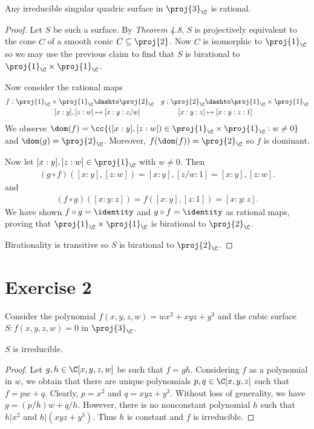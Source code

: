 \documentclass{article}
\begin{document}
\begin{claim*}[2]
  Any irreducible singular quadric surface in $\proj{3}_{\C}$ is rational.
  \begin{proof}
    Let $S$ be such a surface. By \emph{Theorem 4.8}, $S$ is projectively equivalent
    to the cone $\widehat C$ of a smooth conic $C\subseteq\proj{2}$. Now $C$ is isomorphic
    to $\proj{1}_{\C}$ so we may use the previous claim to find that $S$ is birational
    to $\proj{1}_{\C}\times\proj{1}_{\C}$.

    Now consider the rational maps
    \begin{align*}
      f : \proj{1}_{\C}\times\proj{1}_{\C} &\dashto \proj{2}_{\C} &
      g : \proj{2}_{\C} &\dashto \proj{1}_{\C}\times\proj{1}_{\C} \\
      [x:y],[z:w] &\mapsto [x:y:z/w] &
      [x:y:z] &\mapsto [x:y:z:1]
    \end{align*}
    We observe $\dom(f)=\cc{([x:y],[z:w])\in\proj{1}_{\C}\times\proj{1}_{\C} : w \neq 0}$
    and $\dom(g) = \proj{2}_{\C}$. Moreover, $f(\dom(f))=\proj{2}_{\C}$ so $f$ is dominant.

    Now let $[x:y],[z:w]\in\proj{1}_{\C}$ with $w\neq 0$. Then
    \begin{align*}
      (g\circ f)([x:y],[z:w]) = [x:y],[z/w : 1] = [x:y],[z:w].
    \end{align*}
    and
    \begin{align*}
      (f\circ g)([x:y:z]) = f([x:y],[z:1]) = [x:y:z].
    \end{align*}
    We have shown $f\circ g = \identity$ and $g\circ f=\identity$ as rational maps,
    proving that $\proj{1}_{\C}\times\proj{1}_{\C}$ is birational to $\proj{2}_{\C}$.

    Birationality is transitive so $S$ is birational to $\proj{2}_{\C}$.
  \end{proof}
\end{claim*}

\section*{Exercise 2}

Consider the polynomial $f(x,y,z,w)=wx^2 + xyz + y^3$ and the cubic surface
$S:f(x,y,z,w) = 0$ in $\proj{3}_{\C}$.

\begin{claim*}[1a]
  $S$ is irreducible.
  \begin{proof}
    Let $g,h\in\C[x,y,z,w]$ be such that $f=gh$. Considering $f$ as a polynomial in $w$,
    we obtain that there are unique polynomials $p,q\in\C[x,y,z]$ such that
    $f=p w + q$. Clearly, $p=x^2$ and $q = xyz + y^3$. Without loss of generality, we
    have $g = (p/h) w + q/h$. However, there is no nonconstant polynomial $h$ such that
    $h | x^2$ and $h | (xyz + y^3)$. Thus $h$ is constant and $f$ is irreducible.
  \end{proof}
\end{claim*}
\end{document}
